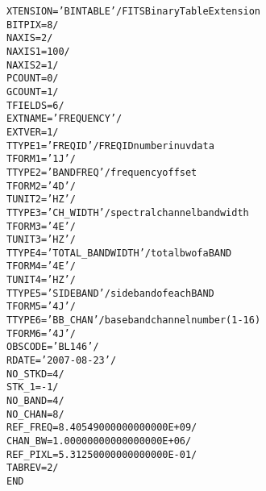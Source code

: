 \documentclass[twoside]{article}
\begin{document}
\begin{alltt}
XTENSION= 'BINTABLE'           / FITS Binary Table Extension
BITPIX  =                    8 /
NAXIS   =                    2 /
NAXIS1  =                  100 /
NAXIS2  =                    1 /
PCOUNT  =                    0 /
GCOUNT  =                    1 /
TFIELDS =                    6 /
EXTNAME = 'FREQUENCY'          /
EXTVER  =                    1 /
TTYPE1  = 'FREQID  '           / FREQID number in uv data
TFORM1  = '1J      '           /
TTYPE2  = 'BANDFREQ'           / frequency offset
TFORM2  = '4D      '           /
TUNIT2  = 'HZ      '           /
TTYPE3  = 'CH_WIDTH'           / spectral channel bandwidth
TFORM3  = '4E      '           /
TUNIT3  = 'HZ      '           /
TTYPE4  = 'TOTAL_BANDWIDTH'    / total bw of a BAND
TFORM4  = '4E      '           /
TUNIT4  = 'HZ      '           /
TTYPE5  = 'SIDEBAND'           / sideband of each BAND
TFORM5  = '4J      '           /
TTYPE6  = 'BB_CHAN '           / baseband channel number (1-16)
TFORM6  = '4J      '           /
OBSCODE = 'BL146   '           /
RDATE   = '2007-08-23'         /
NO_STKD =                    4 /
STK_1   =                   -1 /
NO_BAND =                    4 /
NO_CHAN =                    8 /
REF_FREQ=   8.40549000000000000E+09 /
CHAN_BW =   1.00000000000000000E+06 /
REF_PIXL=   5.31250000000000000E-01 /
TABREV  =                    2 /
END
\end{alltt}
\end{document}
